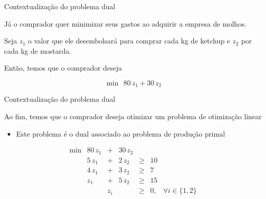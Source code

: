 \documentclass[compress,mathserif]{beamer}
\begin{document}

\begin{frame}{Contextualização do problema dual}

Já o comprador quer minimizar seus gastos ao adquirir a empresa de molhos. 

Seja $z_1$ o valor que ele desembolsará para comprar cada kg de ketchup e $z_2$ por cada kg de mostarda. 

Então, temos que o comprador deseja

$$
    \min~~80\,z_1 + 30\,z_2
$$

\end{frame}


\begin{frame}{Contextualização do problema dual}

Ao fim, temos que o comprador deseja otimizar um problema de otimização linear
\begin{itemize}
    \item Este problema é o dual associado ao problema de produção primal
\end{itemize}

$$\begin{matrix}
        \min & 80\,z_1 & + & 30\,z_2 \\
         & 5\,z_1 & + & 2\,z_2 & \geq & 10 \\
         & 4\,z_1 & + & 3\,z_2 & \geq & 7 \\
         & z_1 & + & 5\,z_2 & \geq & 15 \\
         & & z_i & & \geq & 0, & \forall i \in \{1, 2\}
        \end{matrix}
$$

\end{frame}

\end{document}
